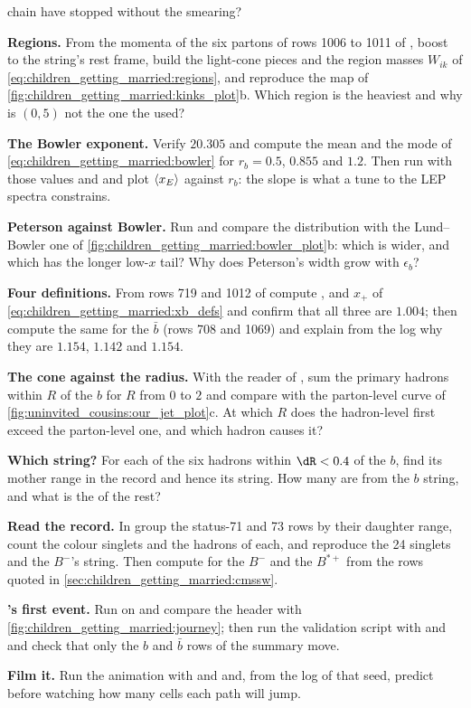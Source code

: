 \begin{exercises}
  chain have stopped without the smearing?
\item \textbf{Regions.} From the momenta of the six partons of rows 1006 to
  1011 of , boost to the string's rest frame, build
  the light-cone pieces and the region masses $W_{ik}$ of
  \cref{eq:children_getting_married:regions}, and reproduce the map of
  \cref{fig:children_getting_married:kinks_plot}b. Which region is the
  heaviest and why is $(0,5)$ not the one the \Bstarbar used?
\item \textbf{The Bowler exponent.} Verify $20.305$ and compute the mean
  and the mode of \cref{eq:children_getting_married:bowler} for
  $r_b=0.5$, $0.855$ and $1.2$. Then run  with those values
  and  and plot $\langle x_E\rangle$ against $r_b$: the
  slope is what a tune to the LEP spectra constrains.
\item \textbf{Peterson against Bowler.} Run 
  and compare the \xE distribution with the Lund--Bowler one of
  \cref{fig:children_getting_married:bowler_plot}b: which is wider, and
  which has the longer low-$x$ tail? Why does Peterson's width grow with
  $\epsilon_b$?
\item \textbf{Four definitions.} From rows 719 and 1012 of
   compute \xE, \xpt and $x_+$ of
  \cref{eq:children_getting_married:xb_defs} and confirm that all three
  are $1.004$; then compute the same for the $\bar b$ (rows 708 and 1069)
  and explain from the log why they are $1.154$, $1.142$ and $1.154$.
\item \textbf{The cone against the radius.} With the reader of
  , sum the primary hadrons within $R$ of the $b$
  for $R$ from $0$ to $2$ and compare with the parton-level curve of
  \cref{fig:uninvited_cousins:our_jet_plot}c. At which $R$ does the
  hadron-level \pt first exceed the parton-level one, and which hadron
  causes it?
\item \textbf{Which string?} For each of the six hadrons within $\dR<0.4$
  of the $b$, find its mother range in the record and hence its string.
  How many are from the $b$ string, and what is the \pt of the rest?
\item \textbf{Read the \CMSSW record.} In 
  group the status-71 and 73 rows by their daughter range, count the
  colour singlets and the hadrons of each, and reproduce the 24 singlets
  and the $B^-$'s string. Then compute \xE for the $B^-$ and the $B^{*+}$
  from the rows quoted in \cref{sec:children_getting_married:cmssw}.
\item \textbf{\PYTHIA's first event.} Run  on
   and compare
  the header with \cref{fig:children_getting_married:journey}; then run
  the validation script with  and  and
  check that only the $b$ and $\bar b$ rows of the summary move.
\item \textbf{Film it.} Run the animation with  and
   and, from the  log of that seed, predict before
  watching how many cells each path will jump.
\end{exercises}

